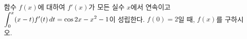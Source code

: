 함수 $f(x)$에 대하여 $f'(x)$가 모든 실수 $x$에서 연속이고 $\displaystyle\int_{0}^{x}(x-t)f'(t)\mkern3mu dt=\cos 2x-x^2-1$이 성립한다. $f(0)=2$일 때, $f(x)$를 구하시오.
